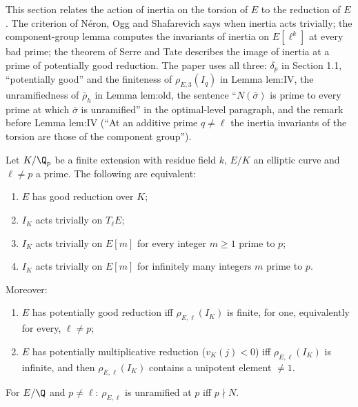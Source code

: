 This section relates the action of inertia on the torsion of $E$ to the reduction of $E$. The criterion of N\'eron, Ogg and
Shafarevich says when inertia acts trivially; the component-group lemma computes the invariants of inertia on $E[\ell^k]$ at every bad
prime; the theorem of Serre and Tate describes the image of inertia at a prime of potentially good reduction. The paper uses all
three: $\delta_p$ in Section 1.1, ``potentially good'' and the finiteness of $\rho_{E,3}(I_q)$ in Lemma lem:IV, the unramifiedness of $\bar\rho_h$ in Lemma lem:old, the
sentence ``$N(\bar\sigma)$ is prime to every prime at which $\bar\sigma$ is unramified'' in the optimal-level paragraph, and the remark before
Lemma lem:IV (``At an additive prime $q\ne\ell$ the inertia invariants of the torsion are those of the component group'').

\begin{theorem}\label{thm:galrep:nos}
Let $K/\Q_p$ be a finite extension with residue field $k$, $E/K$ an elliptic curve and $\ell\ne p$ a prime. The following are equivalent:
\begin{enumerate}[label=(\alph*)]
\item $E$ has good reduction over $K$;
\item $I_K$ acts trivially on $T_\ell E$;
\item $I_K$ acts trivially on $E[m]$ for every integer $m\ge1$ prime to $p$;
\item $I_K$ acts trivially on $E[m]$ for infinitely many integers $m$ prime to $p$.
\end{enumerate}
Moreover:
\begin{enumerate}[label=(\alph*),start=5]
\item $E$ has potentially good reduction iff $\rho_{E,\ell}(I_K)$ is finite, for one, equivalently for every, $\ell\ne p$;
\item $E$ has potentially multiplicative reduction ($v_K(j)<0$) iff $\rho_{E,\ell}(I_K)$ is infinite, and then $\rho_{E,\ell}(I_K)$ contains a unipotent
element $\ne1$.
\end{enumerate}
For $E/\Q$ and $p\ne\ell$: $\rho_{E,\ell}$ is unramified at $p$ iff $p\nmid N$.
\end{theorem}

